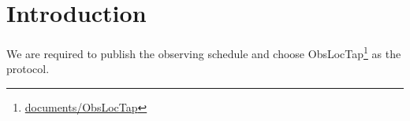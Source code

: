 \section{Introduction}
We are required to publish the observing schedule and choose ObsLocTap\footnote{\url{documents/ObsLocTap}} as the protocol.


